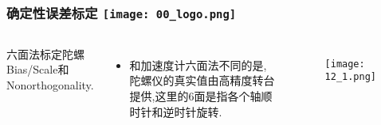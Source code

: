 \begin{comment}
\end{comment}
\begin{frame}
\frametitle{确定性误差标定 \hfill \texttt{[image: 00\_logo.png]}}
\begin{columns}
  
  六面法标定陀螺Bias/Scale和Nonorthogonality.
  
  \begin{itemize}
    \item 和加速度计六面法不同的是,陀螺仪的真实值由高精度转台提供,这里的6面是指各个轴顺时针和逆时针旋转.
  \end{itemize}
  
	\begin{figure}[h]
		\texttt{[image: 12\_1.png]}
  \end{figure}
  

\end{columns}
\end{frame} 
